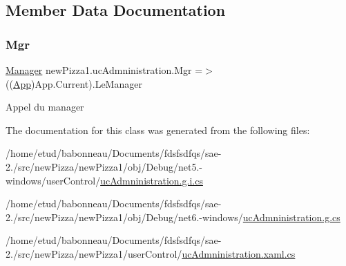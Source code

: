 \subsection{Member Data Documentation}
\mbox{\label{classnewPizza1_1_1ucAdmninistration_a74229d73a1ccb7500c882d4425c05753}} 
\subsubsection{\texorpdfstring{Mgr}{Mgr}}
{\footnotesize\ttfamily \hyperlink{classModele_1_1Manager}{Manager} new\+Pizza1.\+uc\+Admninistration.\+Mgr =$>$ ((\hyperlink{classnewPizza1_1_1App}{App})App.\+Current).Le\+Manager}



Appel du manager 



The documentation for this class was generated from the following files\+:\begin{DoxyCompactItemize}
\item 
/home/etud/babonneau/\+Documents/fdsfsdfqs/sae-\/2./src/new\+Pizza/new\+Pizza1/obj/\+Debug/net5.-\/windows/user\+Control/\hyperlink{net5_80-windows_2userControl_2ucAdmninistration_8g_8i_8cs}{uc\+Admninistration.\+g.\+i.\+cs}\item 
/home/etud/babonneau/\+Documents/fdsfsdfqs/sae-\/2./src/new\+Pizza/new\+Pizza1/obj/\+Debug/net6.-\/windows/\hyperlink{Debug_2net6_80-windows_2ucAdmninistration_8g_8cs}{uc\+Admninistration.\+g.\+cs}\item 
/home/etud/babonneau/\+Documents/fdsfsdfqs/sae-\/2./src/new\+Pizza/new\+Pizza1/user\+Control/\hyperlink{ucAdmninistration_8xaml_8cs}{uc\+Admninistration.\+xaml.\+cs}\end{DoxyCompactItemize}
